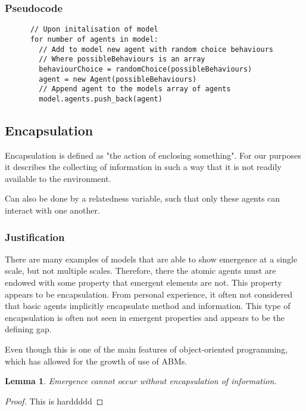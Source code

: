 \documentclass{article}
\newtheorem{lemma}[theorem]{Lemma}
\begin{document}
    \subsubsection{Pseudocode}
      
      \begin{verbatim}
      // Upon initalisation of model
      for number of agents in model:
        // Add to model new agent with random choice behaviours
        // Where possibleBehaviours is an array
        behaviourChoice = randomChoice(possibleBehaviours) 
        agent = new Agent(possibleBehaviours)
        // Append agent to the models array of agents
        model.agents.push_back(agent)
      \end{verbatim}


  \subsection{Encapsulation}
  \label{sec: encap}
      
    Encapsulation is defined as "the action of enclosing something". For our purposes it describes the collecting of information in such a way that it is not readily available to the environment.

    Can also be done by a relatedness variable, such that only these agents can interact with one another.

    \subsubsection{Justification}
      There are many examples of models that are able to show emergence at a single scale, but not multiple scales. Therefore, there the atomic agents must are endowed with some property that emergent elements are not. This property appears to be encapsulation. From personal experience, it often not considered that basic agents implicitly encapsulate method and information. This type of encapsulation is often not seen in emergent properties and appears to be the defining gap.

      Even though this is one of the main features of object-oriented programming, which has allowed for the growth of use of ABMs. 


      \begin{lemma}
        Emergence cannot occur without encapsulation of information.
      \end{lemma}
      \begin{proof}
        
        This is harddddd

      \end{proof}
\end{document}
